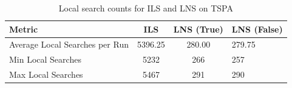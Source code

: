 \begin{table}[h!]
\centering
\begin{tabular}{lcc}
\hline
Metric & ILS & LNS (True) & LNS (False)\\
\hline
Average Local Searches per Run & 5396.25 & 280.00 & 279.75 \\
Min Local Searches & 5232 & 266 & 257 \\
Max Local Searches & 5467 & 291 & 290 \\
\hline
\end{tabular}
\caption{Local search counts for ILS and LNS on TSPA}
\label{tab:TSPA_local_search_counts}
\end{table}
